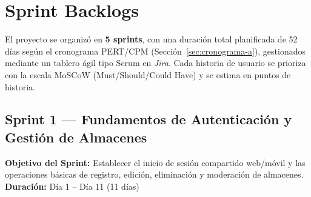 \section{Sprint Backlogs}
El proyecto se organizó en \textbf{5 sprints}, con una duración total planificada de 52 días según el cronograma PERT/CPM (Sección~\ref{sec:cronograma-a}), gestionados mediante un tablero ágil tipo Scrum en \textit{Jira}. Cada historia de usuario se prioriza con la escala MoSCoW (Must/Should/Could Have) y se estima en puntos de historia.

\subsection{Sprint 1 --- Fundamentos de Autenticación y Gestión de Almacenes}
\textbf{Objetivo del Sprint:} Establecer el inicio de sesión compartido web/móvil y las operaciones básicas de registro, edición, eliminación y moderación de almacenes.\\
\textbf{Duración:} Día 1 -- Día 11 (11 días)

